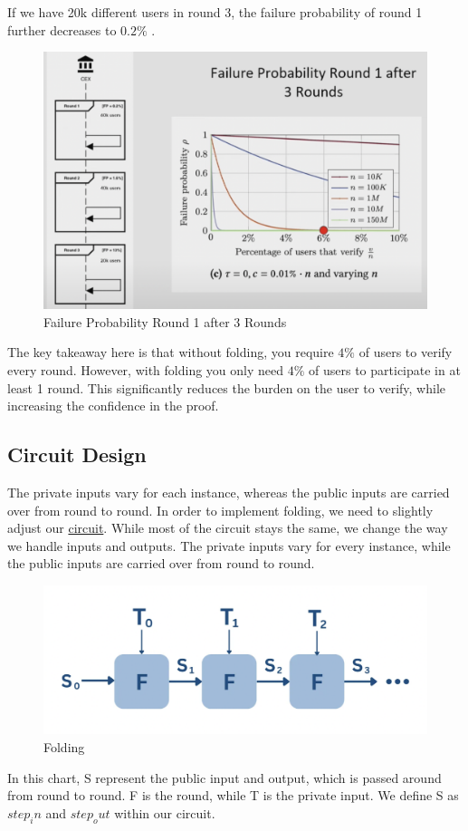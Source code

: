 If we have 20k different users in round 3, the failure probability of round 1 further decreases to $0.2\%$ .

\begin{figure}[H]
   \centering
   \includegraphics[width=130mm]{FailureProbabilityRound3.png}
   \caption{Failure Probability Round 1 after 3 Rounds \cite{NS23}}
   \label{overflow}
   \end{figure}
The key takeaway here is that without folding, you require $4\%$ of users to verify every round. However, with folding you only need
$4\%$  of users to participate in at least 1 round. This significantly reduces the burden on the user to verify, while increasing the confidence in the proof.

\subsection{Circuit Design}
The private inputs vary for each instance, whereas the public inputs are carried over from round to round.
In order to implement folding, we need to slightly adjust our \hyperref[subsec:pi]{circuit}. While most of the circuit stays the same, we change the way we handle inputs and outputs.
The private inputs vary for every instance, while the public inputs are carried over from round to round.
\begin{figure}[H]
   \centering
   \includegraphics[width=130mm]{FoldingCircuit.png}
   \caption{Folding \cite{VRS23}}
   \label{overflow}
   \end{figure}
In this chart, S represent the public input and output, which is passed around from round to round. F is the round, while T is the private input.
We define S as $step_in$ and $step_out$ within our circuit.

